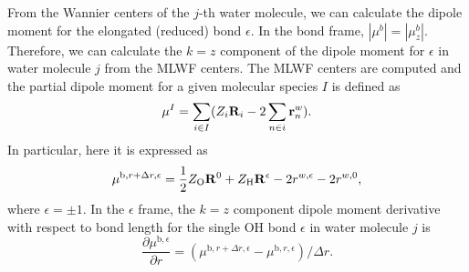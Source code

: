     From the Wannier centers of the $j$-th water molecule, we can calculate the dipole moment for the elongated (reduced) 
    bond ${\epsilon}$. 
    In the bond frame, $|\mu^b| =|\mu^b_z|$. 
    Therefore, we can calculate the $k=z$ component of the dipole moment for ${\epsilon}$ in water molecule $j$ from the MLWF centers. \cite{Silvestrelli1999} 
      The MLWF centers are computed  and the partial dipole moment for a given molecular species $I$ is defined as \cite{Salanne08}
      \begin{equation}
        \mu^I = \sum_{i\in I}(Z_i {\bf R}_i - 2\sum_{n\in i} {\bf r}^w_n).
      \end{equation}
In particular, here it is expressed as 
\begin{equation}
  \mu^{\text{b},r+\Delta r,\epsilon} = \frac{1}{2}Z_{\text{O}} {\bf R}^{0} +Z_{\text{H}}{\bf R}^{\epsilon} -2r^{w,\epsilon} -2r^{w,0},
\end{equation}
where $\epsilon=\pm 1$.
In the $\epsilon$ frame, the $k=z$ component dipole moment derivative with respect to bond length \cite{Wilson1955} for the single OH bond $\epsilon$ in water molecule $j$ is
        \begin{equation}
          \frac{\partial \mu^{\text{b},\epsilon}}{\partial r} = (\mu^{\text{b},r+\Delta r,\epsilon}-\mu^{\text{b},r,\epsilon})/\Delta r.
        \end{equation}
